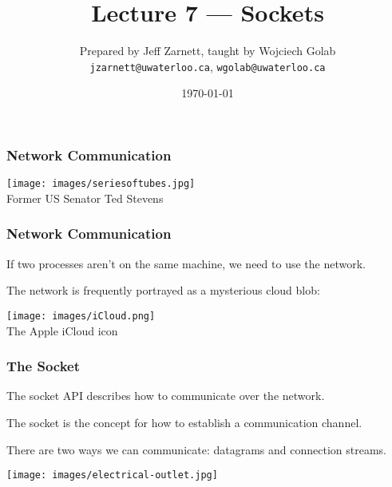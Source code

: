 

\title{Lecture 7 --- Sockets }

\author{Prepared by Jeff Zarnett, taught by Wojciech Golab \\ \small \texttt{jzarnett@uwaterloo.ca}, \texttt{wgolab@uwaterloo.ca}}
\date{\today}




\begin{frame}
	\titlepage

\end{frame}


\begin{frame}
	\frametitle{Network Communication}

	\begin{center}
		\texttt{[image: images/seriesoftubes.jpg]}\\
		Former US Senator Ted Stevens
	\end{center}


\end{frame}


\begin{frame}
	\frametitle{Network Communication}

	If two processes aren't on the same machine, we need to use the network.

	The network is frequently portrayed as a mysterious cloud blob:

	\begin{center}
		\texttt{[image: images/iCloud.png]}\\
		The Apple iCloud icon
	\end{center}

\end{frame}


\begin{frame}
	\frametitle{The Socket}

	The \alert{socket} API describes how to communicate over the network.

	The socket is the concept for how to establish a communication channel.

	There are two ways we can communicate: datagrams and connection streams.

	\begin{center}
		\texttt{[image: images/electrical-outlet.jpg]}
	\end{center}

\end{frame}


